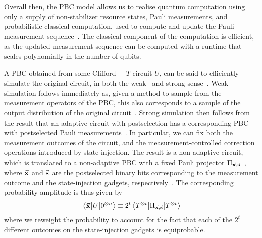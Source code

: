Overall then, the PBC model allows us to realise quantum computation using only a supply of non-stabilizer resource states, Pauli measurements, and probabilistic classical computation, used to compute and update the Pauli measurement sequence~\cite{Yoganathan2019}. The classical component of the computation is efficient, as the updated measurement sequence can be computed with a runtime that scales polynomially in the number of qubits.\par
A PBC obtained from some Clifford + $T$ circuit $U$, can be said to efficiently simulate the original circuit, in both the weak~\cite{Yoganathan2019} and strong sense~\cite{Bravyi2015}. Weak simulation follows immediately as, given a method to sample from the measurement operators of the PBC, this also corresponds to a sample of the output distribution of the original circuit~\cite{Yoganathan2019}. Strong simulation then follows from the result that an adaptive circuit with postselection has a corresponding PBC with postselected Pauli measurements~\cite{Yoganathan2019}. In particular, we can fix both the measurement outcomes of the circuit, and the measurement-controlled correction operations introduced by state-injection. The result is a non-adaptive circuit, which is translated to a non-adaptive PBC with a fixed Pauli projector $\Pi_{\va{x},\va{s}}$~\cite{Yoganathan2019}, where $\va{x}$ and $\va{s}$ are the postselected binary bits corresponding to the measurement outcome and the state-injection gadgets, respectively~\cite{Bravyi2015,Bravyi2016}. The corresponding probability amplitude is thus given by
\begin{equation}
\matrixel{\va{x}}{U}{0^{\otimes n}}\equiv 2^{t}\matrixel{T^{\otimes t}}{\Pi_{\va{x},\va{s}}}{T^{\otimes t}}
\label{eq:pbc_strongsim}
\end{equation}
where we reweight the probability to account for the fact that each of the $2^{t}$ different outcomes on the state-injection gadgets is equiprobable.
